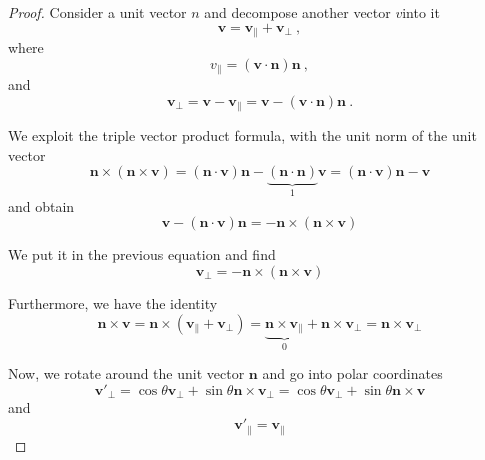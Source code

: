     \begin{proof}
        Consider a unit vector $n$ and decompose another vector $v$into it 
        \begin{equation*}
            \mathbf v = \mathbf v_\parallel + \mathbf v_\perp ~,
        \end{equation*}
        where 
        \begin{equation*}
            v_\parallel = (\mathbf v \cdot \mathbf n) \mathbf n ~,
        \end{equation*} 
        and 
        \begin{equation*}
            \mathbf v_\perp = \mathbf v - \mathbf v_\parallel = \mathbf v - (\mathbf v \cdot \mathbf n) \mathbf n ~.
        \end{equation*}

        We exploit the triple vector product formula, with the unit norm of the unit vector
        \begin{equation*}
            \mathbf n \times (\mathbf n \times \mathbf v) = (\mathbf n \cdot \mathbf v) \mathbf n - \underbrace{(\mathbf n \cdot \mathbf n)}_{1}\mathbf v = (\mathbf n \cdot \mathbf v) \mathbf n - \mathbf v
        \end{equation*}
        and obtain 
        \begin{equation*}
            \mathbf v - (\mathbf n \cdot \mathbf v) \mathbf n = - \mathbf n \times (\mathbf n \times \mathbf v)
        \end{equation*}

        We put it in the previous equation and find 
        \begin{equation*}
            \mathbf v_\perp = - \mathbf n \times (\mathbf n \times \mathbf v)
        \end{equation*}

        Furthermore, we have the identity 
        \begin{equation*}
            \mathbf n \times \mathbf v = \mathbf n \times (\mathbf v_\parallel + \mathbf v_\perp) = \underbrace{\mathbf n \times \mathbf v_\parallel}_{0} + \mathbf n \times \mathbf v_\perp = \mathbf n \times \mathbf v_\perp
        \end{equation*}

        Now, we rotate around the unit vector $\mathbf n$ and go into polar coordinates 
        \begin{equation*}
            \mathbf {v'}_\perp = \cos \theta \mathbf v_\perp + \sin \theta \mathbf n \times \mathbf v_\perp = \cos \theta \mathbf v_\perp + \sin \theta \mathbf n \times \mathbf v
        \end{equation*}
        and 
        \begin{equation*}
            \mathbf {v'}_\parallel = \mathbf v_\parallel
        \end{equation*}


\end{proof}
